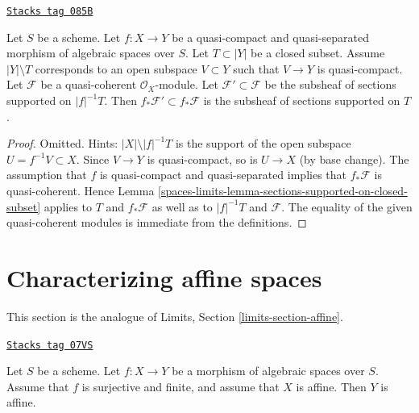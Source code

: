 \begin{lemma}
\label{spaces-limits-lemma-push-sections-supported-on-closed-subset}
\href{https://stacks.math.columbia.edu/tag/085B}{\texttt{Stacks tag 085B}}

Let $S$ be a scheme.
Let $f : X \to Y$ be a quasi-compact and quasi-separated morphism
of algebraic spaces over $S$. Let $T \subset |Y|$ be a closed subset.
Assume $|Y| \setminus T$ corresponds to an open subspace $V \subset Y$
such that $V \to Y$ is quasi-compact. Let $\mathcal{F}$ be a quasi-coherent
$\mathcal{O}_X$-module. Let $\mathcal{F}' \subset \mathcal{F}$
be the subsheaf of sections supported on $|f|^{-1}T$.
Then $f_*\mathcal{F}' \subset f_*\mathcal{F}$ is the subsheaf
of sections supported on $T$.
\end{lemma}

\begin{proof}
Omitted. Hints: $|X| \setminus |f|^{-1}T$ is the support of the open subspace
$U = f^{-1}V \subset X$. Since $V \to Y$ is quasi-compact, so is
$U \to X$ (by base change). The assumption that $f$ is quasi-compact and
quasi-separated implies that $f_*\mathcal{F}$ is quasi-coherent.
Hence Lemma \ref{spaces-limits-lemma-sections-supported-on-closed-subset}
applies to $T$ and $f_*\mathcal{F}$ as well as to
$|f|^{-1}T$ and $\mathcal{F}$. The equality of the given quasi-coherent
modules is immediate from the definitions.
\end{proof}

\section{Characterizing affine spaces}
\label{spaces-limits-section-affine}
This section is the analogue of Limits, Section \ref{limits-section-affine}.

\begin{lemma}[Affine]
\label{spaces-limits-lemma-affine}
\href{https://stacks.math.columbia.edu/tag/07VS}{\texttt{Stacks tag 07VS}}

Let $S$ be a scheme. Let $f : X \to Y$ be a morphism of algebraic spaces
over $S$. Assume that $f$ is surjective and finite, and assume that $X$
is affine. Then $Y$ is affine.
\end{lemma}

